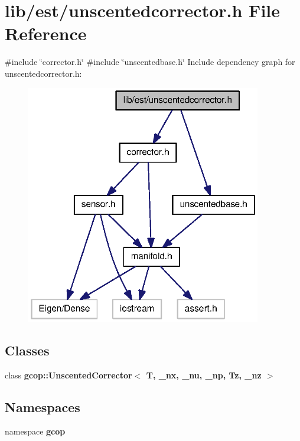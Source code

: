 \section{lib/est/unscentedcorrector.h \-File \-Reference}
\label{unscentedcorrector_8h}
{\ttfamily \#include \char`\"{}corrector.\-h\char`\"{}}\*
{\ttfamily \#include \char`\"{}unscentedbase.\-h\char`\"{}}\*
\-Include dependency graph for unscentedcorrector.\-h\-:\nopagebreak
\begin{figure}[H]
\begin{center}
\leavevmode
\includegraphics[width=291pt]{unscentedcorrector_8h__incl}
\end{center}
\end{figure}
\subsection*{\-Classes}
\begin{DoxyCompactItemize}
\item 
class {\bf gcop\-::\-Unscented\-Corrector$<$ T, \-\_\-nx, \-\_\-nu, \-\_\-np, Tz, \-\_\-nz $>$}
\end{DoxyCompactItemize}
\subsection*{\-Namespaces}
\begin{DoxyCompactItemize}
\item 
namespace {\bf gcop}
\end{DoxyCompactItemize}
